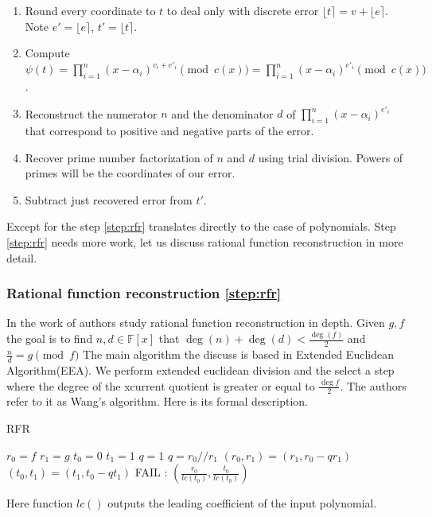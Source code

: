 \documentclass[12pt]{article}
\begin{document}
\begin{enumerate}
    \item Round every coordinate to $t$ to deal only with discrete error $\lfloor t \rceil = v + \lfloor e \rceil$. Note $e' = \lfloor e \rceil$, $t' = \lfloor t \rceil$.
    \item Compute $\psi(t) = \prod_{i=1}^{n}(x - \alpha_{i})^{v_{i} + e'_i} \pmod{c(x)} = \prod_{i=1}^{n}(x - \alpha_{i})^{e'_i} \pmod{c(x)}$.
    \item \label{step:rfr} Reconstruct the numerator $n$ and the denominator $d$ of $\prod_{i=1}^{n}(x - \alpha_{i})^{e'_i}$ that correspond to positive and negative parts of the error.
    \item Recover prime number factorization of $n$ and $d$ using trial division. Powers of primes will be the coordinates of our error.
    \item Subtract just recovered error from $t'$.
\end{enumerate}

Except for the step \ref{step:rfr} translates directly to the case of polynomials. Step \ref{step:rfr} needs more work, let us discuss rational function reconstruction in more detail.

\subsubsection{Rational function reconstruction \ref{step:rfr}}
\label{subsubsec:rfr}
In the work of \cite{[KM06]} authors study rational function reconstruction in depth.  Given $g,f$ the goal is to find $n, d \in \mathbb{F}[x]$ that $\deg(n) + \deg(d) < \frac{\deg(f)}{2}$ and $\frac{n}{d} = g \pmod{f}$ The main algorithm the discuss is based in Extended Euclidean Algorithm(EEA). We perform extended euclidean division and the select a step where the degree of the xcurrent quotient is greater or equal to $\frac{\deg f}{2}$. The authors refer to it as Wang's algorithm. Here is its formal description.

\begin{algorithm}
\caption{RFR}\label{RFR}
\begin{algorithmic}[1]
    \State $r_0 = f$  $r_1 = g$
    \State $t_0 = 0$  $t_1 = 1$
    \State $q = 1$
        \State $q = r_0 // r_1$
        \State $(r_0, r_1) = (r_1, r_0 - qr_1)$
        \State $(t_0, t_1) = (t_1, t_0 - qt_1)$
    \EndWhile
        \State \Return FAIL
    \Else:
            \State \Return  $(\frac{r_0}{lc(t_0)}, \frac{t_0}{lc(t_0)})$
    \EndIf
\EndProcedure
\end{algorithmic}
\end{algorithm}
Here function $lc()$ outputs the leading coefficient of the input polynomial.
\end{document}
